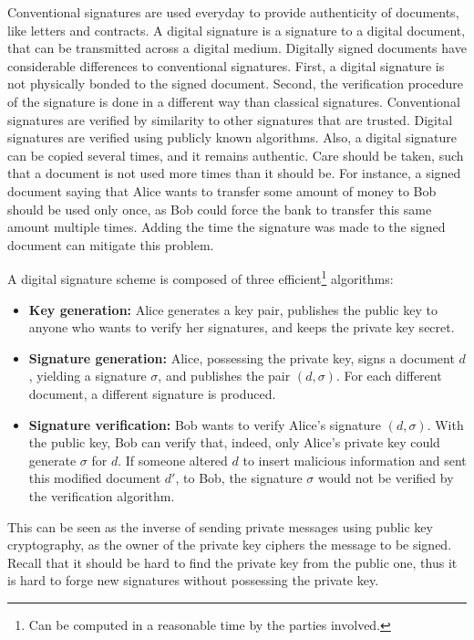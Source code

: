 \documentclass{ufsctex/ufsctex}
\begin{document}
Conventional signatures are used everyday to provide authenticity of documents,
like letters and contracts. A digital signature is a signature to a digital
document, that can be transmitted across a digital medium. Digitally signed
documents have considerable differences to conventional signatures. First, a
digital signature is not physically bonded to the signed document. Second, the
verification procedure of the signature is done in a different way than
classical signatures. Conventional signatures are verified by similarity to
other signatures that are trusted. Digital signatures are verified using
publicly known algorithms. Also, a digital signature can be copied several
times, and it remains authentic. Care should be taken, such that a document is
not used more times than it should be. For instance, a signed document saying
that Alice wants to transfer some amount of money to Bob should be used only
once, as Bob could force the bank to transfer this same amount multiple times.
Adding the time the signature was made to the signed document can mitigate this
problem.

A digital signature scheme is composed of three efficient\footnote{Can be
computed in a reasonable time by the parties involved.} algorithms:

\begin{itemize}

	\item \textbf{Key generation:} Alice generates a key pair, publishes the
	public key to anyone who wants to verify her signatures, and keeps the
	private key secret.

	\item \textbf{Signature generation:} Alice, possessing the private key,
	signs a document $d$, yielding a signature $\sigma$, and publishes the pair
	$(d, \sigma)$. For each different document, a different signature is
	produced.

	\item \textbf{Signature verification:} Bob wants to verify Alice's
	signature $(d, \sigma)$. With the public key, Bob can verify that, indeed,
	only Alice's private key could generate $\sigma$ for $d$. If someone
	altered $d$ to insert malicious information and sent this modified document
	$d'$, to Bob, the signature $\sigma$ would not be verified by the
	verification algorithm.

\end{itemize}

This can be seen as the inverse of sending private messages using public key
cryptography, as the owner of the private key ciphers the message to be signed.
Recall that it should be hard to find the private key from the public one, thus
it is hard to forge new signatures without possessing the private key.
\end{document}
